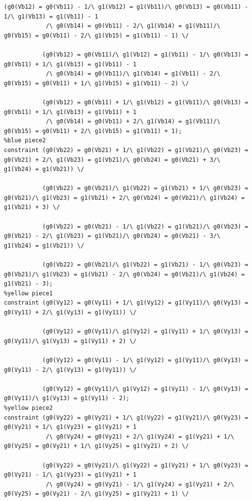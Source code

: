 \begin{appendices}
\begin{lstlisting}[language=minizinc]
           (g0(Vb12) = g0(Vb11) - 1/\ g1(Vb12) = g1(Vb11)/\ g0(Vb13) = g0(Vb11) - 1/\ g1(Vb13) = g1(Vb11) - 1
            /\ g0(Vb14) = g0(Vb11) - 2/\ g1(Vb14) = g1(Vb11)/\ g0(Vb15) = g0(Vb11) - 2/\ g1(Vb15) = g1(Vb11) - 1) \/
            
           (g0(Vb12) = g0(Vb11)/\ g1(Vb12) = g1(Vb11) - 1/\ g0(Vb13) = g0(Vb11) + 1/\ g1(Vb13) = g1(Vb11) - 1
            /\ g0(Vb14) = g0(Vb11)/\ g1(Vb14) = g1(Vb11) - 2/\ g0(Vb15) = g0(Vb11) + 1/\ g1(Vb15) = g1(Vb11) - 2) \/
            
           (g0(Vb12) = g0(Vb11) + 1/\ g1(Vb12) = g1(Vb11)/\ g0(Vb13) = g0(Vb11) + 1/\ g1(Vb13) = g1(Vb11) + 1
            /\ g0(Vb14) = g0(Vb11) + 2/\ g1(Vb14) = g1(Vb11)/\ g0(Vb15) = g0(Vb11) + 2/\ g1(Vb15) = g1(Vb11) + 1);
%blue piece2 
constraint (g0(Vb22) = g0(Vb21) + 1/\ g1(Vb22) = g1(Vb21)/\ g0(Vb23) = g0(Vb21) + 2/\ g1(Vb23) = g1(Vb21)/\ g0(Vb24) = g0(Vb21) + 3/\ g1(Vb24) = g1(Vb21)) \/
            
           (g0(Vb22) = g0(Vb21)/\ g1(Vb22) = g1(Vb21) + 1/\ g0(Vb23) = g0(Vb21)/\ g1(Vb23) = g1(Vb21) + 2/\ g0(Vb24) = g0(Vb21)/\ g1(Vb24) = g1(Vb21) + 3) \/
            
           (g0(Vb22) = g0(Vb21) - 1/\ g1(Vb22) = g1(Vb21)/\ g0(Vb23) = g0(Vb21) - 2/\ g1(Vb23) = g1(Vb21)/\ g0(Vb24) = g0(Vb21) - 3/\ g1(Vb24) = g1(Vb21)) \/
            
           (g0(Vb22) = g0(Vb21)/\ g1(Vb22) = g1(Vb21) - 1/\ g0(Vb23) = g0(Vb21)/\ g1(Vb23) = g1(Vb21) - 2/\ g0(Vb24) = g0(Vb21)/\ g1(Vb24) = g1(Vb21) - 3);
%yellow piece1
constraint (g0(Vy12) = g0(Vy11) + 1/\ g1(Vy12) = g1(Vy11)/\ g0(Vy13) = g0(Vy11) + 2/\ g1(Vy13) = g1(Vy11)) \/

           (g0(Vy12) = g0(Vy11)/\ g1(Vy12) = g1(Vy11) + 1/\ g0(Vy13) = g0(Vy11)/\ g1(Vy13) = g1(Vy11) + 2) \/
           
           (g0(Vy12) = g0(Vy11) - 1/\ g1(Vy12) = g1(Vy11)/\ g0(Vy13) = g0(Vy11) - 2/\ g1(Vy13) = g1(Vy11)) \/
           
           (g0(Vy12) = g0(Vy11)/\ g1(Vy12) = g1(Vy11) - 1/\ g0(Vy13) = g0(Vy11)/\ g1(Vy13) = g1(Vy11) - 2);     
%yellow piece2           
constraint (g0(Vy22) = g0(Vy21) + 1/\ g1(Vy22) = g1(Vy21)/\ g0(Vy23) = g0(Vy21) + 1/\ g1(Vy23) = g1(Vy21) + 1
            /\ g0(Vy24) = g0(Vy21) + 2/\ g1(Vy24) = g1(Vy21) + 1/\ g0(Vy25) = g0(Vy21) + 1/\ g1(Vy25) = g1(Vy21) + 2) \/
            
           (g0(Vy22) = g0(Vy21)/\ g1(Vy22) = g1(Vy21) + 1/\ g0(Vy23) = g0(Vy21) - 1/\ g1(Vy23) = g1(Vy21) + 1
            /\ g0(Vy24) = g0(Vy21) - 1/\ g1(Vy24) = g1(Vy21) + 2/\ g0(Vy25) = g0(Vy21) - 2/\ g1(Vy25) = g1(Vy21) + 1) \/
            

\end{lstlisting}
\end{appendices}
